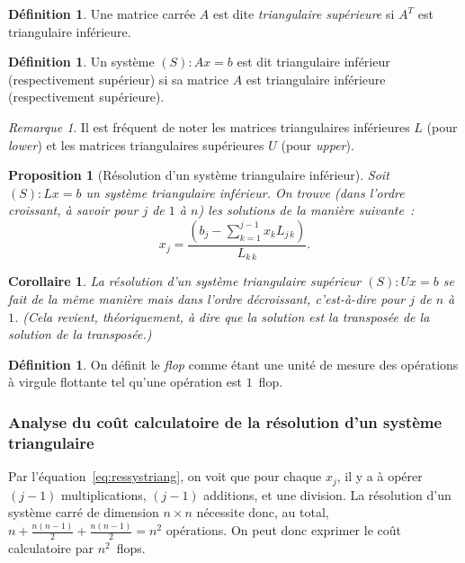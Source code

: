 \documentclass{article}
\newtheorem{prp}[thm]{Proposition}
\newtheorem{cor}[thm]{Corollaire}
\theoremstyle{definition}
\newtheorem{déf}[thm]{Définition}
\theoremstyle{remark}
\newtheorem*{rmq}{Remarque}
\begin{document}
		\begin{déf} Une matrice carrée $A$ est dite \emph{triangulaire supérieure} si $A^T$ est triangulaire inférieure. \end{déf}

		\begin{déf} Un système $(S) : Ax = b$ est dit triangulaire inférieur (respectivement supérieur) si sa matrice $A$ est triangulaire inférieure
		(respectivement supérieure).
		\end{déf}

		\begin{rmq} Il est fréquent de noter les matrices triangulaires inférieures $L$ (pour \emph{lower}) et les matrices triangulaires supérieures $U$
		(pour \emph{upper}).
		\end{rmq}

		\begin{prp}[Résolution d'un système triangulaire inférieur] Soit $(S) : Lx = b$ un système triangulaire inférieur. On trouve (dans l'ordre croissant,
		à savoir pour $j$ de $1$ à $n$) les solutions de la manière suivante~:
		\begin{equation}\label{eq:ressystriang}
			x_j = \frac {(b_j - \sum_{k=1}^{j-1}x_kL_{j\,k})}{L_{k\,k}}.
		\end{equation}
		\end{prp}

		\begin{cor} La résolution d'un système triangulaire supérieur $(S) : Ux = b$ se fait de la même manière mais dans l'ordre décroissant, c'est-à-dire
		pour $j$ de $n$ à $1$. (Cela revient, théoriquement, à dire que la solution est la transposée de la solution de la transposée.)
		\end{cor}

		\begin{déf} On définit le \emph{flop} comme étant une unité de mesure des opérations à virgule flottante tel qu'une opération est $1$~flop. \end{déf}

		\subsubsection{Analyse du coût calculatoire de la résolution d'un système triangulaire}
		Par l'équation~\eqref{eq:ressystriang}, on voit que pour chaque $x_j$, il y a à opérer $(j-1)$ multiplications, $(j-1)$ additions, et une division.
		La résolution d'un système carré de dimension $n \times n$ nécessite donc, au total, $n + \frac {n(n-1)}2 + \frac {n(n-1)}2 = n^2$ opérations.
		On peut donc exprimer le coût calculatoire par $n^2$~flops.
\end{document}
